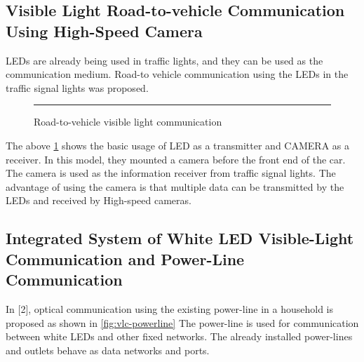 \subsection{Visible Light Road-to-vehicle Communication Using High-Speed Camera}

LEDs are already being used in traffic lights, and they can be used as the communication
medium. Road-to vehicle communication using the LEDs in the traffic signal lights was
proposed.

\begin{figure}[htbp]
  \centering
    \rule{35em}{0.5pt}
  \caption[Road-to-vehicle visible light communication]{Road-to-vehicle visible light communication}
  \label{fig:vlc-road}
\end{figure}

The above \ref{fig:vlc-road} shows the basic usage of LED as a transmitter and CAMERA as a
receiver. In this model, they mounted a camera before the front end of the car. The
camera is used as the information receiver from traffic signal lights. The advantage of
using the camera is that multiple data can be transmitted by the LEDs and received by
High-speed cameras. 


\subsection{Integrated System of White LED Visible-Light Communication and Power-Line Communication}

In [2], optical communication using the existing power-line in a household is proposed as
shown in \ref{fig:vlc-powerline}
The power-line is used for communication between white LEDs and other fixed
networks. The already installed power-lines and outlets behave as data networks and
ports.

